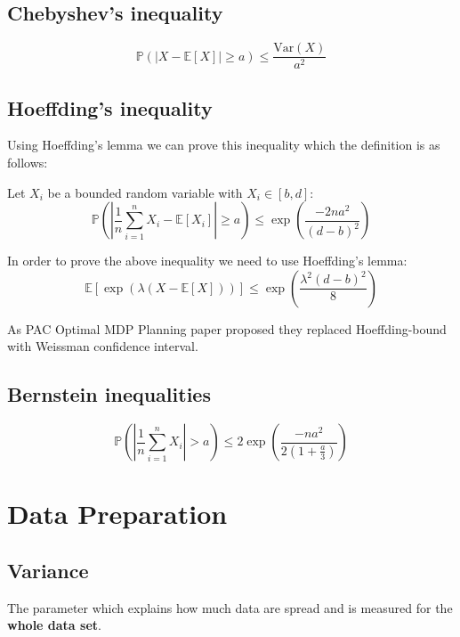 \documentclass[a4paper,12pt]{article}
\begin{document}
\subsection{Chebyshev's inequality}
\begin{equation}
\mathbb {P}(|X - \mathbb{E}[X]| \geq a ) \leq \frac { \mathrm { Var}( X ) } { a^2 }
\end{equation}


\subsection{Hoeffding's inequality}
Using Hoeffding's lemma we can prove this inequality which the definition is as follows:

Let $X_i$ be a bounded random variable with $X_i \in [b, d]$:
\begin{equation}
    \mathbb {P} \left( \left| \frac{1}{n} \sum_{i=1}^{n} X_i - \mathbb{E}[X_i] \right| \geq a \right) \leq { \exp \left( \frac{-2 n a ^ {2} }{ \left(d-b \right) ^ 2} \right) }
\end{equation}

In order to prove the above inequality we need to use Hoeffding's lemma:
\begin{equation}
    \mathbb {E} \left[ \exp \left( {\lambda ( X - \mathbb {E}[X] )} \right)  \right] \leq \exp \left( \frac{\lambda ^ 2 (d-b)^2}{8} \right)
\end{equation}

As PAC Optimal MDP Planning paper \cite{AlkaeeTaleghan2015a} proposed they replaced Hoeffding-bound with Weissman confidence interval.

\subsection{Bernstein inequalities}
\begin{equation}
    \mathbb { P } \left( \left| \frac { 1 } { n } \sum _ { i = 1 } ^ { n } X _ { i } \right| > a \right) \leq 2 \exp \left( \frac {- n a ^ {2} } { 2 \left( 1 + \frac {a} {3} \right) } \right)
\end{equation}

\section{Data Preparation}

\subsection{Variance}
The parameter which explains how much data are spread and is measured for the \textbf{whole data set}.
\end{document}
